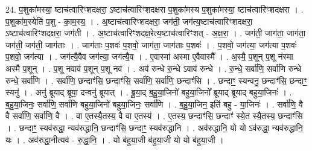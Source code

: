 \documentclass[17pt]{extarticle}
\begin{document}
24. प॒शुका॑मस्या॒ ष्टाच॑त्वारिꣳशदक्षरा॒ ऽष्टाच॑त्वारिꣳशदक्षरा प॒शुका॑मस्य प॒शुका॑मस्या॒ ष्टाच॑त्वारिꣳशदक्षरा । . प॒शुका॑म॒स्येति॑ प॒शु - का॒म॒स्य॒ । . अ॒ष्टाच॑त्वारिꣳशदक्षरा॒ जग॑ती॒ जग॑त्य॒ष्टाच॑त्वारिꣳशदक्षरा॒ ऽष्टाच॑त्वारिꣳशदक्षरा॒ जग॑ती । . अ॒ष्टाच॑त्वारिꣳशदक्ष॒रेत्य॒ष्टाच॑त्वारिꣳशत् - अ॒क्ष॒रा॒ । . जग॑ती॒ जाग॑ता॒ जाग॑ता॒ जग॑ती॒ जग॑ती॒ जाग॑ताः । . जाग॑ताः प॒शवः॑ प॒शवो॒ जाग॑ता॒ जाग॑ताः प॒शवः॑ । . प॒शवो॒ जग॑त्या॒ जग॑त्या प॒शवः॑ प॒शवो॒ जग॑त्या । . जग॑त्यै॒वैव जग॑त्या॒ जग॑त्यै॒व । . ए॒वास्मा॑ अस्मा ए॒वैवास्मै᳚ । . अ॒स्मै॒ प॒शून् प॒शू न॑स्मा अस्मै प॒शून् । . प॒शू नवाव॑ प॒शून् प॒शू नव॑ । . अव॑ रुन्धे रु॒न्धे ऽवाव॑ रुन्धे । . रु॒न्धे॒ सर्वा॑णि॒ सर्वा॑णि रुन्धे रुन्धे॒ सर्वा॑णि । . सर्वा॑णि॒ छन्दाꣳ॑सि॒ छन्दाꣳ॑सि॒ सर्वा॑णि॒ सर्वा॑णि॒ छन्दाꣳ॑सि । . छन्दाꣳ॒॒ स्यन्वनु॒ छन्दाꣳ॑सि॒ छन्दाꣳ॒॒ स्यनु॑ । . अनु॑ ब्रूयाद् ब्रूया॒ दन्वनु॑ ब्रूयात् । . ब्रू॒या॒द् ब॒हु॒या॒जिनो॑ बहुया॒जिनो᳚ ब्रूयाद् ब्रूयाद् बहुया॒जिनः॑ । . ब॒हु॒या॒जिनः॒ सर्वा॑णि॒ सर्वा॑णि बहुया॒जिनो॑ बहुया॒जिनः॒ सर्वा॑णि । . ब॒हु॒या॒जिन॒ इति॑ बहु - या॒जिनः॑ । . सर्वा॑णि॒ वै वै सर्वा॑णि॒ सर्वा॑णि॒ वै । . वा ए॒तस्यै॒तस्य॒ वै वा ए॒तस्य॑ । . ए॒तस्य॒ छन्दाꣳ॑सि॒ छन्दाꣳ॑ स्ये॒त स्यै॒तस्य॒ छन्दाꣳ॑सि । . छन्दाꣳ॒॒ स्यव॑रुद्धा॒ न्यव॑रुद्धानि॒ छन्दाꣳ॑सि॒ छन्दाꣳ॒॒ स्यव॑रुद्धानि । . अव॑रुद्धानि॒ यो यो ऽव॑रुद्धा॒ न्यव॑रुद्धानि॒ यः । . अव॑रुद्धा॒नीत्यव॑ - रु॒द्धा॒नि॒ । . यो ब॑हुया॒जी ब॑हुया॒जी यो यो ब॑हुया॒जी । \newline
\end{document}
